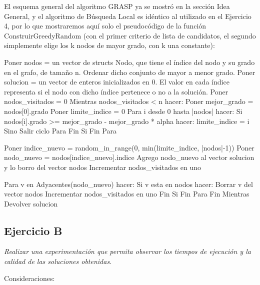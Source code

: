 El esquema general del algoritmo GRASP ya se mostró en la sección Idea General, y el algoritmo de Búsqueda Local es idéntico al utilizado en el Ejercicio 4, por lo que mostraremos aquí solo el pseudocódigo de la función ConstruirGreedyRandom (con el primer criterio de lista de candidatos, el segundo simplemente elige los k nodos de mayor grado, con k una constante):

\begin{codesnippet}
Poner nodos = un vector de structs Nodo, que tiene el índice del nodo y su grado
    en el grafo, de tamaño n.
Ordenar dicho conjunto de mayor a menor grado.
Poner solucion = un vector de enteros inicializados en 0. El valor en cada índice
    representa si el nodo con dicho índice pertenece o no a la solución.
Poner nodos_visitados = 0
Mientras nodos_visitados < n hacer:
    Poner mejor_grado = nodos[0].grado
    Poner limite_indice = 0
    Para i desde 0 hasta |nodos| hacer:
        Si nodos[i].grado >= mejor_grado - mejor_grado * alpha hacer:
            limite_indice = i
        Sino
            Salir ciclo Para
        Fin Si
    Fin Para

    Poner indice_nuevo = random_in_range(0, min(limite_indice, |nodos|-1))
    Poner nodo_nuevo = nodos[indice_nuevo].indice
    Agrego nodo_nuevo al vector solucion y lo borro del vector nodos
    Incrementar nodos_visitados en uno

    Para v en Adyacentes(nodo_nuevo) hacer:
        Si v esta en nodos hacer:
            Borrar v del vector nodos
            Incrementar nodos_visitados en uno
        Fin Si
    Fin Para
Fin Mientras
Devolver solucion
\end{codesnippet}

\subsection{Ejercicio B}

\textit{Realizar una experimentación que permita observar los tiempos de ejecución y la calidad de las soluciones obtenidas.}

\medskip

Consideraciones:

